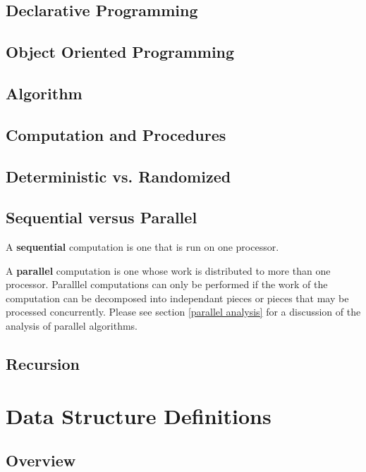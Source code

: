 \documentclass[12pt, letterpaper]{book}
\begin{document}
\section{Declarative Programming}

\section{Object Oriented Programming}

\section{Algorithm}

\section{Computation and Procedures}

\section{Deterministic vs. Randomized}

\section{Sequential versus Parallel}

	A \textbf{sequential} computation is one that is run on one processor.

	A \textbf{parallel} computation is one whose work is distributed to more than one processor. Paralllel computations can only be performed if the work of the computation can be decomposed into independant pieces or pieces that may be processed concurrently. Please see section \ref{parallel analysis} for a discussion of the analysis of parallel algorithms.

\section{Recursion}

\chapter{Data Structure Definitions}

\section{Overview}
\end{document}
